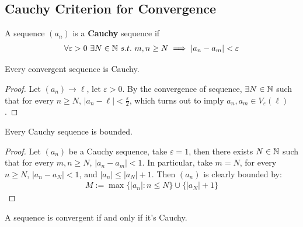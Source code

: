 \documentclass[11pt]{article}
\begin{document}
	\subsection{Cauchy Criterion for Convergence}
	\begin{definition}
		A sequence $(a_n)$ is a \textbf{Cauchy} sequence if
		\begin{align}
			\forall \varepsilon > 0\ \exists N \in \mathbb{N}\ s.t.\ m, n \geq N \implies |a_n - a_m| < \varepsilon
		\end{align}
	\end{definition}
	
	\begin{theorem}
		Every convergent sequence is Cauchy.
	\end{theorem}
	
	\begin{proof}
		Let $(a_n) \to \ell$, let $\varepsilon > 0$. By the convergence of sequence, $\exists N \in \mathbb{N}$ such that for every $ n \geq N$, $|a_n - \ell| < \frac{\varepsilon}{2}$, which turns out to imply $a_n, a_m \in V_\varepsilon(\ell)$.
	\end{proof}
	
	\begin{lemma}
		Every Cauchy sequence is bounded.
	\end{lemma}
	
	\begin{proof}
		Let $(a_n)$ be a Cauchy sequence, take $\varepsilon = 1$, then there exists $N \in \mathbb{N}$ such that for every $m, n \geq N$, $|a_n - a_m| < 1$. In particular, take $m = N$, for every $n \geq N$, $|a_n - a_N| < 1$, and $|a_n| \leq |a_N| + 1$. Then $(a_n)$ is clearly bounded by:
		\begin{align}
			M := \max \{|a_n|: n \leq N\} \cup \{|a_N| + 1\}
		\end{align}
	\end{proof}
	
	\begin{theorem}
		A sequence  is convergent if and only if it's Cauchy.
	\end{theorem}
	
\end{document}
